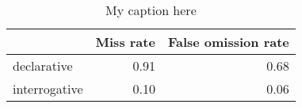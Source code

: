 \begin{table}[!ht]
\centering
\begin{tabular}{lrr}
\toprule
{} &  Miss rate &  False omission rate \\
\midrule
declarative   &       0.91 &                 0.68 \\
interrogative &       0.10 &                 0.06 \\
\bottomrule
\end{tabular}
\caption{My caption here}
\label{tab:INDICATIVE-ocd-combined-errors}
\end{table}